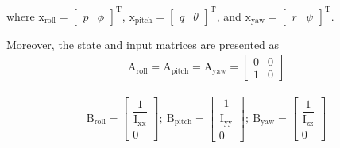 \documentclass[3p,times]{elsarticle}
\begin{document}
where $\boldsymbol{\mathrm{x}}_{\text{roll}} = \begin{bmatrix}
	p & \phi
\end{bmatrix}^\mathrm{T}$, $\boldsymbol{\mathrm{x}}_{\text{pitch}} = \begin{bmatrix}
	q & \theta \end{bmatrix}^\mathrm{T}$, and $\boldsymbol{\mathrm{x}}_{\text{yaw}} = \begin{bmatrix}
	r & \psi
\end{bmatrix}^\mathrm{T}$.



Moreover, the state and input matrices are presented as
\begin{equation}
	\begin{split}
		\boldsymbol{\mathrm{A}}_{\text{roll}}  =\boldsymbol{\mathrm{A}}_{\text{pitch}}  = \boldsymbol{\mathrm{A}}_{\text{yaw}}  = \begin{bmatrix}
			0 & 0\\
			1 & 0
		\end{bmatrix}
	\end{split}
\end{equation}

\begin{equation}
	\begin{split}
		\boldsymbol{\mathrm{B}}_{\text{roll}}  = \begin{bmatrix}
			\dfrac{1}{\mathrm{I}_{\text{xx}}}
			\\[1em]
			0
		\end{bmatrix};~ \boldsymbol{\mathrm{B}}_{\text{pitch}}  = \begin{bmatrix}
			\dfrac{1}{\mathrm{I}_{\text{yy}}}
			\\[1em]
			0
		\end{bmatrix};~ \boldsymbol{\mathrm{B}}_{\text{yaw}}  = \begin{bmatrix}
			\dfrac{1}{\mathrm{I}_{\text{zz}}}
			\\[1em]
			0
		\end{bmatrix}
	\end{split}
\end{equation}
\end{document}

